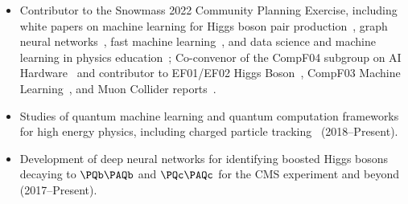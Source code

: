 \documentclass[11pt]{res}
\begin{document}
\begin{resume}
\begin{itemize}
    \item Contributor to the Snowmass 2022 Community Planning Exercise, including white papers on machine learning for Higgs boson pair production~\cite{Apresyan:2022tqw}, graph neural networks~\cite{Thais:2022iok}, fast machine learning~\cite{Harris:2022qtm}, and data science and machine learning in physics education~\cite{Benelli:2022sqn}; Co-convenor of the CompF04 subgroup on AI Hardware~\cite{Bhimij:2022xyn} and contributor to EF01/EF02 Higgs Boson~\cite{Dawson:2022zbb}, CompF03 Machine Learning~\cite{Shanahan:2022ifi}, and Muon Collider reports~\cite{Black:2022cth}.
    \item Studies of quantum machine learning and quantum computation frameworks for high energy physics, including charged particle tracking~\cite{Zlokapa:2019tkn} ({2018--Present}).
    \item Development of deep neural networks for identifying boosted Higgs bosons decaying to $\bbbar$ and $\ccbar$ for the CMS experiment and beyond~\cite{CMS-DP-2022-041,Moreno:2019neq,Moreno:2019bmu,neurips2019_hbb,CMS-DP-2018-046} ({2017--Present}).
  \end{itemize}


\end{resume}
\end{document}
